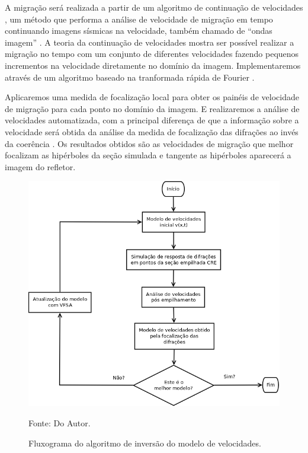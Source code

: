 A migração será realizada a partir de um algoritmo de continuação de velocidades \cite{fomel2003a}, um método que performa
a análise de velocidade de migração em tempo continuando imagens sísmicas na velocidade, também chamado de
``ondas imagem'' \cite{hubral1996}. A teoria da continuação de velocidades mostra ser possível realizar a migração no tempo
com um conjunto de diferentes velocidades fazendo pequenos incrementos na velocidade diretamente no domínio da imagem.
Implementaremos através de um algoritmo baseado na tranformada rápida de Fourier \cite{bfomel2003}.

Aplicaremos uma medida de focalização local para obter os painéis de velocidade de migração para cada ponto no domínio da
imagem. E realizaremos a análise de velocidades automatizada, com a principal diferença de que a informação sobre a velocidade
será obtida da análise da medida de focalização das difrações ao invés da coerência \cite{sep_dif}.
Os resultados obtidos são as velocidades de migração que melhor focalizam as hipérboles da seção simulada e tangente as hipérboles
aparecerá a imagem do refletor.

\begin{figure}[htb]
\caption{Fluxograma do algoritmo de inversão do modelo de velocidades.}
\begin{center}
\includegraphics[scale=0.4]{images/fluxoVel.png}
\vspace{-0.3cm}
\end{center}
\begin{center}
 Fonte: Do Autor.
\end{center}
\label{fig:8.1}
\end{figure}